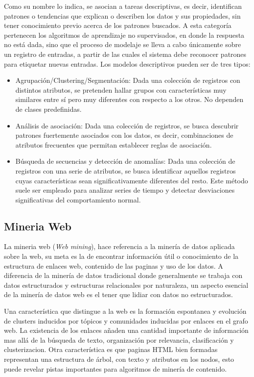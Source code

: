 Como su nombre lo indica, se asocian a tareas descriptivas, es decir, identifican patrones o tendencias que explican o describen los datos y sus propiedades, sin tener conocimiento previo acerca de los patrones buscados. A esta categoría pertenecen los algoritmos de aprendizaje no supervisados, en donde la respuesta no está dada, sino que el proceso de modelaje se lleva a cabo únicamente sobre un registro de entradas, a partir de las cuales el sistema debe reconocer patrones para etiquetar nuevas entradas. Los modelos descriptivos pueden ser de tres tipos:

\begin{itemize}
\item Agrupación/Clustering/Segmentación: Dada una colección de registros con distintos atributos, se pretenden hallar grupos con características muy similares entre sí pero muy diferentes con respecto a los otros. No dependen de clases predefinidas.
\item Análisis de asociación: Dada una colección de registros, se busca descubrir patrones fuertemente asociados con los datos, es decir, combinaciones de atributos frecuentes que permitan establecer reglas de asociación.
\item Búsqueda de secuencias y detección de anomalías: Dada una colección de registros con una serie de atributos, se busca identificar aquellos registros cuyas características sean significativamente diferentes del resto. Este método suele ser empleado para analizar series de tiempo y detectar desviaciones significativas del comportamiento normal.
\end{itemize}

\subsection{Mineria Web}
La mineria web (\emph{Web mining}), hace referencia a la minería de datos aplicada sobre la web, su meta es la de encontrar información útil o conocimiento de la estructura de enlaces web, contenido de las paginas y uso de los datos. A diferencia de la minería de datos tradicional donde generalmente se trabaja con datos estructurados y estructuras relacionales por naturaleza, un aspecto esencial de la minería de datos web es el tener que lidiar con datos no estructurados.\cite{webmining,minwebSoumen}

Una característica que distingue a la web es la formación espontanea y evolución de clusters inducidos por tópicos y comunidades inducidas por enlaces en el grafo web. La existencia de los enlaces añaden una cantidad importante de información mas allá de la búsqueda de texto, organización por relevancia, clasificación y clusterizacion. Otra característica es que paginas HTML bien formadas representan una estructura de árbol, con texto y atributos en los nodos, esto puede revelar pistas importantes para algoritmos de minería de contenido.\cite{minwebSoumen}

